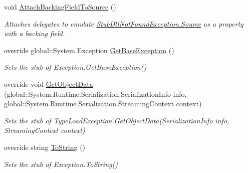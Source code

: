 \begin{DoxyCompactItemize}
void \hyperlink{class_system_1_1_fakes_1_1_stub_dll_not_found_exception_a05651ca1c5952815895476cc4bce6b86}{Attach\-Backing\-Field\-To\-Source} ()
\begin{DoxyCompactList}\small\item\em Attaches delegates to emulate \hyperlink{class_system_1_1_fakes_1_1_stub_dll_not_found_exception_a890f628e0dddc03747667fa798e4b348}{Stub\-Dll\-Not\-Found\-Exception.\-Source} as a property with a backing field.\end{DoxyCompactList}\item 
override global\-::\-System.\-Exception \hyperlink{class_system_1_1_fakes_1_1_stub_dll_not_found_exception_afc4a1efd55fe55ef0a75f0bdc43ef5f3}{Get\-Base\-Exception} ()
\begin{DoxyCompactList}\small\item\em Sets the stub of Exception.\-Get\-Base\-Exception()\end{DoxyCompactList}\item 
override void \hyperlink{class_system_1_1_fakes_1_1_stub_dll_not_found_exception_a80831fcc0174da2d486ec946da13baac}{Get\-Object\-Data} (global\-::\-System.\-Runtime.\-Serialization.\-Serialization\-Info info, global\-::\-System.\-Runtime.\-Serialization.\-Streaming\-Context context)
\begin{DoxyCompactList}\small\item\em Sets the stub of Type\-Load\-Exception.\-Get\-Object\-Data(\-Serialization\-Info info, Streaming\-Context context)\end{DoxyCompactList}\item 
override string \hyperlink{class_system_1_1_fakes_1_1_stub_dll_not_found_exception_a7c2733d5eb337b89d6b6327831826fe9}{To\-String} ()
\begin{DoxyCompactList}\small\item\em Sets the stub of Exception.\-To\-String()\end{DoxyCompactList}\end{DoxyCompactItemize}
